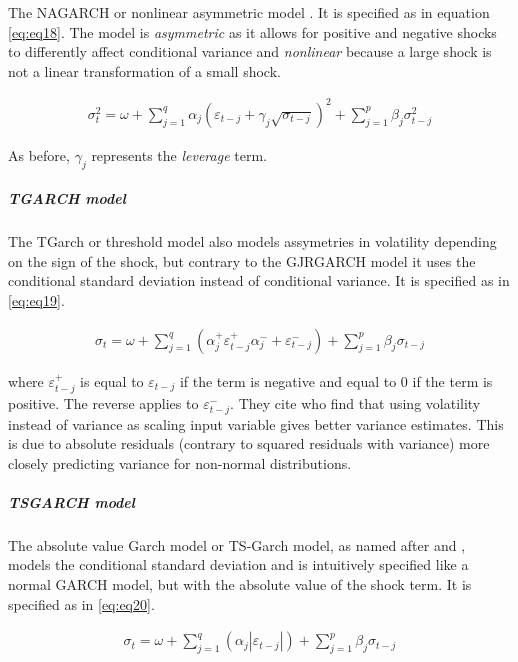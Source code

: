 \documentclass[a4paper, twoside]{templates/ociamthesis}
\begin{document}
\noindent The NAGARCH or nonlinear asymmetric model \autocite{engle1993}. It is specified as in equation \eqref{eq:eq18}. The model is \emph{asymmetric} as it allows for positive and negative shocks to differently affect conditional variance and \emph{nonlinear} because a large shock is not a linear transformation of a small shock.

\begin{align}
\sigma_t^2 = \omega + \sum\limits_{j=1}^q \alpha_j (\varepsilon_{t-j}+ \gamma_j \sqrt{\sigma_{t-j}})^2 + \sum\limits_{j = 1}^p \beta_j \sigma_{t-j}^2
 \label{eq:eq18}
\end{align}

As before, \(\gamma_j\) represents the \emph{leverage} term.

\hypertarget{tgarch-model}{%
\subparagraph{TGARCH model}\label{tgarch-model}}

\noindent The TGarch or threshold model \autocite{zakoian1994} also models assymetries in volatility depending on the sign of the shock, but contrary to the GJRGARCH model it uses the conditional standard deviation instead of conditional variance. It is specified as in \eqref{eq:eq19}.

\begin{align}
\sigma_t = \omega + \sum\limits_{j=1}^q (\alpha_j^+ \varepsilon_{t-j}^+ \alpha_j^{-} + \varepsilon_{t-j}^{-}) + \sum\limits_{j = 1}^p \beta_j \sigma_{t-j}
 \label{eq:eq19}
\end{align}

\noindent where \(\varepsilon_{t-j}^+\) is equal to \(\varepsilon_{t-j}\) if the term is negative and equal to 0 if the term is positive. The reverse applies to \(\varepsilon_{t-j}^-\). They cite \textcite{davidian1987} who find that using volatility instead of variance as scaling input variable gives better variance estimates. This is due to absolute residuals (contrary to squared residuals with variance) more closely predicting variance for non-normal distributions.

\hypertarget{tsgarch-model}{%
\subparagraph{TSGARCH model}\label{tsgarch-model}}

\noindent The absolute value Garch model or TS-Garch model, as named after \textcite{taylor1986} and \textcite{schwert1989}, models the conditional standard deviation and is intuitively specified like a normal GARCH model, but with the absolute value of the shock term. It is specified as in \eqref{eq:eq20}.

\begin{align}
\sigma_t = \omega + \sum\limits_{j=1}^q (\alpha_j \left|\varepsilon_{t-j}\right|) +
\sum\limits_{j = 1}^p \beta_j \sigma_{t-j}
 \label{eq:eq20}
\end{align}
\end{document}
